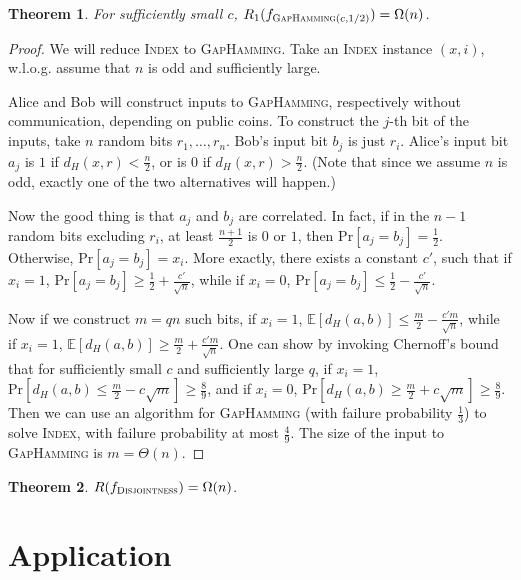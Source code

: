 \documentclass[openany]{book}
\newtheorem{theorem}{Theorem}[chapter]
\begin{document}
\begin{theorem}\label{randOneWayGapHam}
    For sufficiently small $c$,  $R_1(f_{\textsc{GapHamming}(c,1/2)})=\Omega(n)$.
\end{theorem}
\begin{proof}
    We will reduce \textsc{Index} to \textsc{GapHamming}. Take an \textsc{Index} instance $(x,i)$, w.l.o.g. assume that $n$ is odd and sufficiently large.

    Alice and Bob will construct inputs to \textsc{GapHamming}, respectively without communication, depending on public coins. To construct the $j$-th bit of the inputs, take $n$ random bits $r_1,\ldots,r_n$. Bob's input bit $b_j$ is just $r_i$. Alice's input bit $a_j$ is $1$ if $d_H(x,r)<\frac{n}{2}$, or is $0$ if $d_H(x,r)>\frac{n}{2}$. (Note that since we assume $n$ is odd, exactly one of the two alternatives will happen.)

    Now the good thing is that $a_j$ and $b_j$ are correlated. In fact, if in the $n-1$ random bits excluding $r_i$, at least $\frac{n+1}{2}$ is $0$ or $1$, then $\mathrm{Pr}[a_j=b_j]=\frac{1}{2}$. Otherwise, $\mathrm{Pr}[a_j=b_j]=x_i$. More exactly, there exists a constant $c'$, such that if $x_i=1$, $\mathrm{Pr}[a_j=b_j]\ge \frac{1}{2}+\frac{c'}{\sqrt{n}}$, while if $x_i=0$, $\mathrm{Pr}[a_j=b_j]\le \frac{1}{2}-\frac{c'}{\sqrt{n}}$.

    Now if we construct $m=qn$ such bits, if $x_i=1$, $\mathbb{E}[d_H(a,b)]\le \frac{m}{2}-\frac{c'm}{\sqrt{n}}$, while if $x_i=1$, $\mathbb{E}[d_H(a,b)]\ge \frac{m}{2}+\frac{c'm}{\sqrt{n}}$. One can show by invoking Chernoff's bound that for sufficiently small $c$ and sufficiently large $q$, if $x_i=1$, $\mathrm{Pr}[d_H(a,b)\le \frac{m}{2}-c\sqrt{m}]\ge \frac{8}{9}$, and if $x_i=0$, $\mathrm{Pr}[d_H(a,b)\ge \frac{m}{2}+c\sqrt{m}]\ge \frac{8}{9}$. Then we can use an algorithm for \textsc{GapHamming} (with failure probability $\frac{1}{3}$) to solve \textsc{Index}, with failure probability at most $\frac{4}{9}$. The size of the input to \textsc{GapHamming} is $m=\Theta(n)$.
\end{proof}

\begin{theorem}
    $R(f_{\textsc{Disjointness}})=\Omega(n)$.
\end{theorem}

\part{Application}
\end{document}
